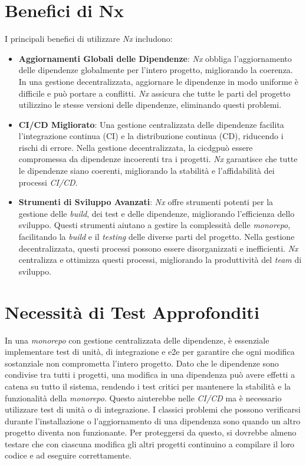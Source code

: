 \section{Benefici di Nx}
I principali benefici di utilizzare \textit{Nx} includono:

\begin{itemize}
    \item \textbf{Aggiornamenti Globali delle Dipendenze}: \textit{Nx} obbliga l'aggiornamento delle dipendenze globalmente per l'intero progetto, migliorando la coerenza.
    In una gestione decentralizzata, aggiornare le dipendenze in modo uniforme è difficile e può portare a conflitti.
    \textit{Nx} assicura che tutte le parti del progetto utilizzino le stesse versioni delle dipendenze, eliminando questi problemi.
    \item \textbf{CI/CD Migliorato}: Una gestione centralizzata delle dipendenze facilita l'integrazione continua (CI) e la distribuzione continua (CD), riducendo i rischi di errore.
    Nella gestione decentralizzata, la \gls{cicdg}\glox può essere compromessa da dipendenze incoerenti tra i progetti.
    \textit{Nx} garantisce che tutte le dipendenze siano coerenti, migliorando la stabilità e l'affidabilità dei processi \textit{CI/CD}.
    \item \textbf{Strumenti di Sviluppo Avanzati}: \textit{Nx} offre strumenti potenti per la gestione delle \textit{build}, dei test e delle dipendenze, migliorando l'efficienza dello sviluppo.
    Questi strumenti aiutano a gestire la complessità delle \textit{monorepo}, facilitando la \textit{build} e il \textit{testing} delle diverse parti del progetto.
    Nella gestione decentralizzata, questi processi possono essere disorganizzati e inefficienti.
    \textit{Nx} centralizza e ottimizza questi processi, migliorando la produttività del \textit{team} di sviluppo.
\end{itemize}

\section{Necessità di Test Approfonditi}
In una \textit{monorepo} con gestione centralizzata delle dipendenze, è essenziale implementare test di unità, di integrazione e \gls{e2e} per garantire che ogni modifica sostanziale non comprometta l'intero progetto.
Dato che le dipendenze sono condivise tra tutti i progetti, una modifica in una dipendenza può avere effetti a catena su tutto il sistema, rendendo i test critici per mantenere la stabilità e la funzionalità della \textit{monorepo}.
Questo aiuterebbe nelle \textit{CI/CD} ma è necessario utilizzare test di unità o di integrazione.
I classici problemi che possono verificarsi durante l'installazione o l'aggiornamento di una dipendenza sono quando un altro progetto diventa non funzionante.
Per proteggersi da questo, si dovrebbe almeno testare che con ciascuna modifica gli altri progetti continuino a compilare il loro codice e ad eseguire correttamente.

\newpage